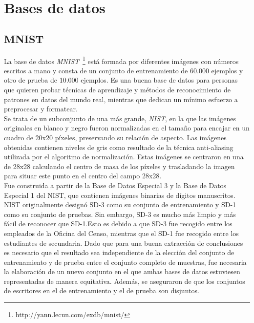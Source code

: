 \vspace{10pt}
\section{Bases de datos}

\subsection{MNIST}\label{sec.minst}
La base de datos \textit{\ac{MNIST}}~\footnote{http://yann.lecun.com/exdb/mnist/} está formada por diferentes imágenes con números escritos a mano y consta de un conjunto de entrenamiento de 60.000 ejemplos y otro de prueba de 10.000 ejemplos. Es una buena base de datos para personas que quieren probar técnicas de aprendizaje y métodos de reconocimiento de patrones en datos del mundo real, mientras que dedican un mínimo esfuerzo a preprocesar y formatear. \\

Se trata de un subconjunto de una más grande, \textit{\ac{NIST}}, en la que las imágenes originales en blanco y negro fueron normalizadas en el tamaño para encajar en un cuadro de 20x20 píxeles, preservando su relación de aspecto. Las imágenes obtenidas contienen niveles de gris como resultado de la técnica anti-aliasing utilizada por el algoritmo de normalización. Estas imágenes se centraron en una de 28x28 calculando el centro de masa de los píxeles y trasladando la imagen para situar este punto en el centro del campo 28x28.\\

Fue construida a partir de la Base de Datos Especial 3 y la Base de Datos Especial 1 del \ac{NIST}, que contienen imágenes binarias de dígitos manuscritos. \ac{NIST} originalmente designó SD-3 como su conjunto de entrenamiento y SD-1 como su conjunto de pruebas. Sin embargo, SD-3 es mucho más limpio y más fácil de reconocer que SD-1.Esto es debido a que SD-3 fue recogido entre los empleados de la Oficina del Censo, mientras que el SD-1 fue recogido entre los estudiantes de secundaria. Dado que para una buena extracción de conclusiones es necesario que el resultado sea independiente de la elección del conjunto de entrenamiento y de prueba entre el conjunto completo de muestras, fue necesaria la elaboración de un nuevo conjunto en el que ambas bases de datos estuviesen representadas de manera equitativa. Además, se aseguraron de que los conjuntos de escritores en el de entrenamiento y el de prueba son disjuntos.\\

